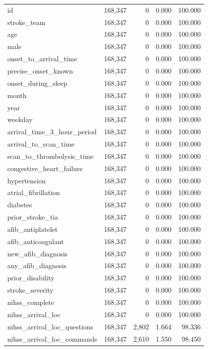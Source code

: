 \begin{longtable}{lrrrr}
id & 168,347 & 0 & 0.000 & 100.000 \\
stroke\_team & 168,347 & 0 & 0.000 & 100.000 \\
age & 168,347 & 0 & 0.000 & 100.000 \\
male & 168,347 & 0 & 0.000 & 100.000 \\
onset\_to\_arrival\_time & 168,347 & 0 & 0.000 & 100.000 \\
precise\_onset\_known & 168,347 & 0 & 0.000 & 100.000 \\
onset\_during\_sleep & 168,347 & 0 & 0.000 & 100.000 \\
month & 168,347 & 0 & 0.000 & 100.000 \\
year & 168,347 & 0 & 0.000 & 100.000 \\
weekday & 168,347 & 0 & 0.000 & 100.000 \\
arrival\_time\_3\_hour\_period & 168,347 & 0 & 0.000 & 100.000 \\
arrival\_to\_scan\_time & 168,347 & 0 & 0.000 & 100.000 \\
scan\_to\_thrombolysis\_time & 168,347 & 0 & 0.000 & 100.000 \\
congestive\_heart\_failure & 168,347 & 0 & 0.000 & 100.000 \\
hypertension & 168,347 & 0 & 0.000 & 100.000 \\
atrial\_fibrillation & 168,347 & 0 & 0.000 & 100.000 \\
diabetes & 168,347 & 0 & 0.000 & 100.000 \\
prior\_stroke\_tia & 168,347 & 0 & 0.000 & 100.000 \\
afib\_antiplatelet & 168,347 & 0 & 0.000 & 100.000 \\
afib\_anticoagulant & 168,347 & 0 & 0.000 & 100.000 \\
new\_afib\_diagnosis & 168,347 & 0 & 0.000 & 100.000 \\
any\_afib\_diagnosis & 168,347 & 0 & 0.000 & 100.000 \\
prior\_disability & 168,347 & 0 & 0.000 & 100.000 \\
stroke\_severity & 168,347 & 0 & 0.000 & 100.000 \\
nihss\_complete & 168,347 & 0 & 0.000 & 100.000 \\
nihss\_arrival\_loc & 168,347 & 0 & 0.000 & 100.000 \\
nihss\_arrival\_loc\_questions & 168,347 & 2,802 & 1.664 & 98.336 \\
nihss\_arrival\_loc\_commands & 168,347 & 2,610 & 1.550 & 98.450 \\

\end{longtable}
